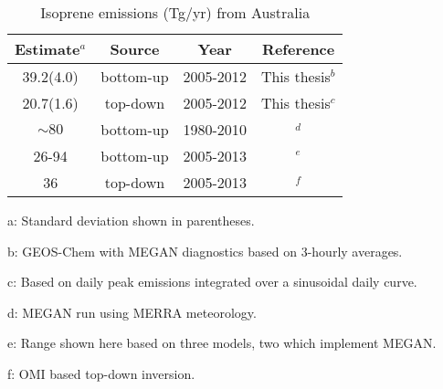     
    
    
    
    
    
    \begin{table}\begin{threeparttable}
      \caption{Isoprene emissions (Tg/yr) from Australia}
      \begin{tabular}{ c c c c } 
        \toprule
        Estimate$^{a}$ & Source & Year & Reference \\
        \midrule
        39.2(4.0) & bottom-up & 2005-2012 & This thesis$^{b}$ \\ %
        20.7(1.6) & top-down & 2005-2012 & This thesis$^{c}$ \\
        $\sim 80$ & bottom-up & 1980-2010 & \textcite{Sindelarova2014}$^{d}$ \\ %
        26-94 & bottom-up & 2005-2013 & \textcite{Bauwens2016}$^{e}$ \\
        36 & top-down & 2005-2013 & \textcite{Bauwens2016}$^{f}$ \\
        \bottomrule
      \end{tabular}
      \begin{tablenotes} 
        \item a: Standard deviation shown in parentheses.
        \item b: GEOS-Chem with MEGAN diagnostics based on 3-hourly averages. 
        \item c: Based on daily peak emissions integrated over a sinusoidal daily curve. 
        \item d: MEGAN run using MERRA meteorology.  
        \item e: Range shown here based on three models, two which implement MEGAN.
        \item f: OMI based top-down inversion.
      \end{tablenotes}
      \label{BioIsop:results:emissions:tab_emissions_Tg}
    \end{threeparttable}\end{table}
    
